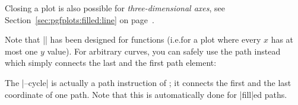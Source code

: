 Closing a plot is also possible for \emph{three-dimensional axes}, see
Section~\ref{sec:pgfplots:filled:line} on
page~\pageref{sec:pgfplots:filled:line}.

Note that |\closedcycle| has been designed for functions (i.e.\@ for a plot
where every $x$ has at most one $y$ value). For arbitrary curves, you can
safely use the \tikzname{} path  instead which simply
connects the last and the first path element:
%
\begin{codeexample}[]
\end{codeexample}

\begin{codeexample}[]
\end{codeexample}

\begin{codeexample}[]
\end{codeexample}

The |--cycle| is actually a path instruction of \cite{tikz}; it connects the
first and the last coordinate of one path. Note that this is automatically done
for |fill|ed paths.
